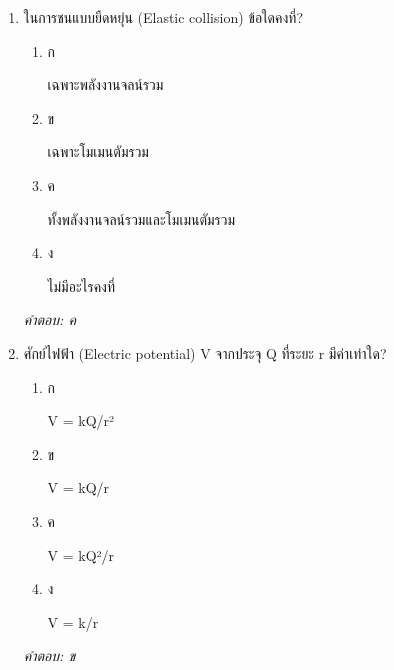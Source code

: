 \documentclass[12pt]{article}
\begin{document}
\begin{enumerate}[label=\arabic*., itemsep=0.5\baselineskip, topsep=0.5\baselineskip, leftmargin=*]
\item ในการชนแบบยืดหยุ่น (Elastic collision) ข้อใดคงที่?
\begin{enumerate}[label=\alph*)., itemsep=0.3\baselineskip, topsep=0.3\baselineskip]
\item ก\ 
\begin{minipage}[t]{0.9\linewidth}
\raggedright เฉพาะพลังงานจลน์รวม
\end{minipage}
\item ข\ 
\begin{minipage}[t]{0.9\linewidth}
\raggedright เฉพาะโมเมนตัมรวม
\end{minipage}
\item ค\ 
\begin{minipage}[t]{0.9\linewidth}
\raggedright ทั้งพลังงานจลน์รวมและโมเมนตัมรวม
\end{minipage}
\item ง\ 
\begin{minipage}[t]{0.9\linewidth}
\raggedright ไม่มีอะไรคงที่
\end{minipage}
\end{enumerate}
\vspace{-0.3\baselineskip}
\begin{small}
\textit{คำตอบ: ค}
\end{small}

\item ศักย์ไฟฟ้า (Electric potential) V จากประจุ Q ที่ระยะ r มีค่าเท่าใด?
\begin{enumerate}[label=\alph*)., itemsep=0.3\baselineskip, topsep=0.3\baselineskip]
\item ก\ 
\begin{minipage}[t]{0.9\linewidth}
\raggedright V = kQ/r²
\end{minipage}
\item ข\ 
\begin{minipage}[t]{0.9\linewidth}
\raggedright V = kQ/r
\end{minipage}
\item ค\ 
\begin{minipage}[t]{0.9\linewidth}
\raggedright V = kQ²/r
\end{minipage}
\item ง\ 
\begin{minipage}[t]{0.9\linewidth}
\raggedright V = k/r
\end{minipage}
\end{enumerate}
\vspace{-0.3\baselineskip}
\begin{small}
\textit{คำตอบ: ข}
\end{small}


\end{enumerate}
\end{document}
